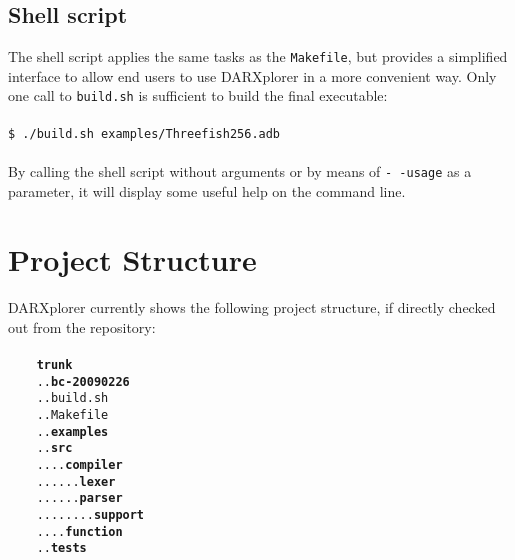 \documentclass{acmtrans2m}
\begin{document}
\subsection{Shell script}
The shell script applies the same tasks as the \texttt{Makefile}, but provides a simplified interface to allow end users to use DARXplorer in a more convenient way. Only one call to \texttt{build.sh} is sufficient to build the final executable:\\ \\ 
\noindent\hspace*{12mm}%
\texttt{\$ ./build.sh examples/Threefish256.adb}\\ \\
By calling the shell script without arguments or by means of \texttt{-\,-usage} as a parameter, it will display some useful help on the command line.

\section{Project Structure}\label{chapter:project}
DARXplorer currently shows the following project structure, if directly checked out from the repository:\\ \\
\noindent\hspace*{12mm}%
\texttt{\ \ \ \ {\bf trunk}\\
\noindent\hspace*{12mm}%
\ \ \ \ ..{\bf bc-20090226}\\
\noindent\hspace*{12mm}%
\ \ \ \ ..build.sh\\
\noindent\hspace*{12mm}%
\ \ \ \ ..Makefile\\
\noindent\hspace*{12mm}%
\ \ \ \ ..{\bf examples}\\
\noindent\hspace*{12mm}%
\ \ \ \ ..{\bf src}\\
\noindent\hspace*{12mm}%
\ \ \ \ ....{\bf compiler}\\
\noindent\hspace*{12mm}%
\ \ \ \ ......{\bf lexer}\\
\noindent\hspace*{12mm}%
\ \ \ \ ......{\bf parser}\\
\noindent\hspace*{12mm}%
\ \ \ \ ........{\bf support}\\
\noindent\hspace*{12mm}%
\ \ \ \ ....{\bf function}\\
\noindent\hspace*{12mm}%
\ \ \ \ ..{\bf tests}\\
}
\end{document}
